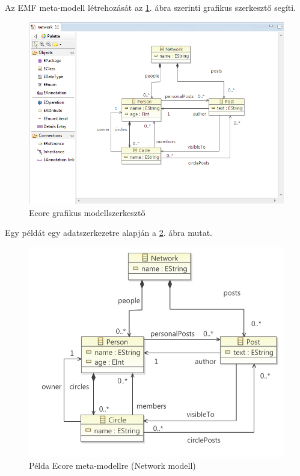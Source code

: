 Az \gls{EMF} meta-modell létrehozását az \ref{fig:EcoreDiagramEditor}. ábra szerinti grafikus szerkesztő segíti.
%
\begin{figure}[htb]
\centering
\includegraphics[width=\textwidth]{figures/ecore-diag-editor.png}
\caption{Ecore grafikus modellszerkesztő}
\label{fig:EcoreDiagramEditor}
\end{figure}
%
Egy példát egy adatszerkezetre \cite{VogelEMF} alapján a \ref{fig:EcoreMetaModelExample}. ábra mutat.
%
\begin{figure}[htb]
\centering
\includegraphics[width=\textwidth]{figures/ecore-network-metamodel-diag.pdf}
\caption{Példa Ecore meta-modellre (Network modell)}
\label{fig:EcoreMetaModelExample}
\end{figure}

